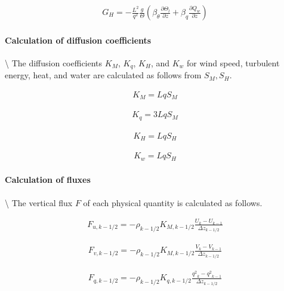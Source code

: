 \begin{eqnarray}G_H=-\frac{L^2}{q^2}\frac{g}{\Theta}\left(\beta_\theta \frac{\partial \Theta_l}{\partial z}+\beta_q \frac{\partial Q_w}{\partial z}\right)\end{eqnarray}

\hypertarget{calculation-of-diffusion-coefficients-1}{%
\paragraph{Calculation of diffusion
coefficients}\label{calculation-of-diffusion-coefficients-1}}

\textbackslash{} The diffusion coefficients \(K_M\), \(K_q\), \(K_H\),
and \(K_w\) for wind speed, turbulent energy, heat, and water are
calculated as follows from \(S_M,S_H\).

\begin{eqnarray}K_M=LqS_M\end{eqnarray}

\begin{eqnarray}K_q=3LqS_M\end{eqnarray}

\begin{eqnarray}K_H=LqS_H\end{eqnarray}

\begin{eqnarray}K_w=LqS_H\end{eqnarray}

\hypertarget{calculation-of-fluxes}{%
\paragraph{Calculation of fluxes}\label{calculation-of-fluxes}}

\textbackslash{} The vertical flux \(F\) of each physical quantity is
calculated as follows.

\begin{eqnarray}F_{u,k-1/2}=-\rho_{k-1/2}K_{M,k-1/2}\frac{U_{k}-U_{k-1}}{\Delta z_{k-1/2}}\end{eqnarray}

\begin{eqnarray}F_{v,k-1/2}=-\rho_{k-1/2}K_{M,k-1/2}\frac{V_{k}-V_{k-1}}{\Delta z_{k-1/2}}\end{eqnarray}

\begin{eqnarray}F_{q,k-1/2}=-\rho_{k-1/2}K_{q,k-1/2}\frac{{q^2}_ {k}-{q^2}_ {k-1}}{\Delta z_{k-1/2}}\end{eqnarray}

